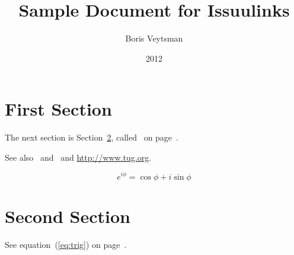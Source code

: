 \documentclass{article}
\begin{document}
\title{Sample Document for Issuulinks}
\author{Boris Veytsman}
\date{2012}
\maketitle
\tableofcontents
\clearpage
\section{First Section}
\label{sec:first}

The next section is Section~\ref{sec:second},
called~ on page~\pageref{sec:second}.

See also~\cite{Knuth94:TheTeXbook} and~\cite{Lamport94} and
\url{http://www.tug.org}. 

\lipsum[1-2]
\lipsum[5-8]

\begin{equation}
  \label{eq:trig}
  e^{i\phi} = \cos\phi+i\sin\phi
\end{equation}


\section{Second Section}
\label{sec:second}

\lipsum[10-14]
See equation~(\ref{eq:trig}) on page~\pageref{eq:trig}.
\printindex


\end{document}

